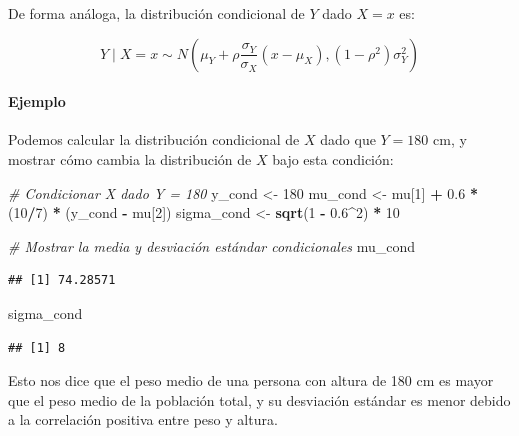 \documentclass[
]{article}
\newenvironment{Shaded}{\begin{snugshade}}{\end{snugshade}}
\newcommand{\CommentTok}[1]{\textcolor[rgb]{0.56,0.35,0.01}{\textit{#1}}}
\newcommand{\DecValTok}[1]{\textcolor[rgb]{0.00,0.00,0.81}{#1}}
\newcommand{\FloatTok}[1]{\textcolor[rgb]{0.00,0.00,0.81}{#1}}
\newcommand{\FunctionTok}[1]{\textcolor[rgb]{0.13,0.29,0.53}{\textbf{#1}}}
\newcommand{\NormalTok}[1]{#1}
\newcommand{\OtherTok}[1]{\textcolor[rgb]{0.56,0.35,0.01}{#1}}
\newcommand{\SpecialCharTok}[1]{\textcolor[rgb]{0.81,0.36,0.00}{\textbf{#1}}}
\begin{document}
De forma análoga, la distribución condicional de \(Y\) dado \(X = x\) es:

\[
Y \mid X = x \sim N \left( \mu_Y + \rho \frac{\sigma_Y}{\sigma_X} (x - \mu_X), (1 - \rho^2)\sigma_Y^2 \right)
\]

\paragraph{Ejemplo}\label{ejemplo-2}

Podemos calcular la distribución condicional de \(X\) dado que \(Y = 180\) cm, y mostrar cómo cambia la distribución de \(X\) bajo esta condición:

\begin{Shaded}
\begin{Highlighting}[]
\CommentTok{\# Condicionar X dado Y = 180}
\NormalTok{y\_cond }\OtherTok{\textless{}{-}} \DecValTok{180}
\NormalTok{mu\_cond }\OtherTok{\textless{}{-}}\NormalTok{ mu[}\DecValTok{1}\NormalTok{] }\SpecialCharTok{+} \FloatTok{0.6} \SpecialCharTok{*}\NormalTok{ (}\DecValTok{10}\SpecialCharTok{/}\DecValTok{7}\NormalTok{) }\SpecialCharTok{*}\NormalTok{ (y\_cond }\SpecialCharTok{{-}}\NormalTok{ mu[}\DecValTok{2}\NormalTok{])}
\NormalTok{sigma\_cond }\OtherTok{\textless{}{-}} \FunctionTok{sqrt}\NormalTok{(}\DecValTok{1} \SpecialCharTok{{-}} \FloatTok{0.6}\SpecialCharTok{\^{}}\DecValTok{2}\NormalTok{) }\SpecialCharTok{*} \DecValTok{10}

\CommentTok{\# Mostrar la media y desviación estándar condicionales}
\NormalTok{mu\_cond}
\end{Highlighting}
\end{Shaded}

\begin{verbatim}
## [1] 74.28571
\end{verbatim}

\begin{Shaded}
\begin{Highlighting}[]
\NormalTok{sigma\_cond}
\end{Highlighting}
\end{Shaded}

\begin{verbatim}
## [1] 8
\end{verbatim}

Esto nos dice que el peso medio de una persona con altura de 180 cm es mayor que el peso medio de la población total, y su desviación estándar es menor debido a la correlación positiva entre peso y altura.
\end{document}
